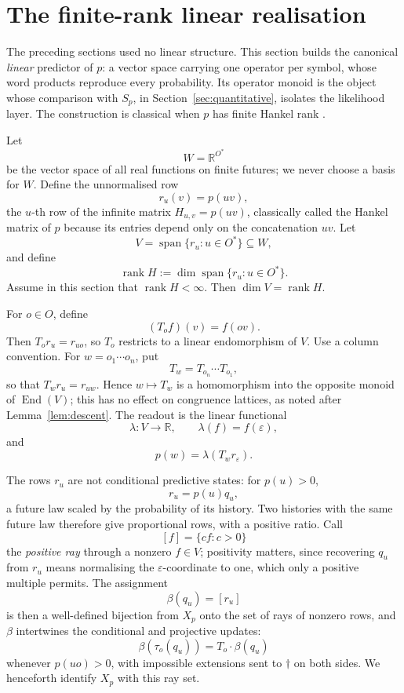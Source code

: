 \documentclass[10pt]{article}
\theoremstyle{definition}
\theoremstyle{remark}
\newcommand{\End}{\operatorname{End}}
\newcommand{\rank}{\operatorname{rank}}
\newcommand{\spn}{\operatorname{span}}
\newcommand{\Obs}{O}
\newcommand{\R}{\mathbb{R}}
\newcommand{\eps}{\varepsilon}
\begin{document}
\section{The finite-rank linear realisation}
\label{sec:linear}

The preceding sections used no linear structure.  This section builds
the canonical \emph{linear} predictor of $p$: a vector space carrying
one operator per symbol, whose word products reproduce every
probability.  Its operator monoid is the object whose comparison with
$S_p$, in Section~\ref{sec:quantitative}, isolates the likelihood
layer.  The construction is classical when $p$ has finite Hankel rank
\cite{Fliess1974,Jaeger2000}.

Let
\[
  W=\R^{\Obs^*}
\]
be the vector space of all real functions on finite futures; we never
choose a basis for $W$.  Define the unnormalised row
\[
  r_u(v)=p(uv),
\]
the $u$-th row of the infinite matrix $H_{u,v}=p(uv)$, classically
called the Hankel matrix of $p$ because its entries depend only on the
concatenation $uv$.  Let
\[
  V=\spn\{r_u:u\in\Obs^*\}\subseteq W,
\]
and define
\[
  \rank H:=\dim\spn\{r_u:u\in\Obs^*\}.
\]
Assume in this section that $\rank H<\infty$.  Then $\dim V=\rank H$.

For $o\in\Obs$, define
\[
  (T_of)(v)=f(ov).
\]
Then $T_or_u=r_{uo}$, so $T_o$ restricts to a linear endomorphism of
$V$.  Use a column convention.  For $w=o_1\cdots o_n$, put
\[
  T_w=T_{o_n}\cdots T_{o_1},
\] so that $T_wr_u=r_{uw}$.  Hence $w\mapsto T_w$ is a homomorphism into the
opposite monoid of $\End(V)$; this has no effect on congruence
lattices, as noted after Lemma~\ref{lem:descent}.  The readout is the
linear functional
\[
  \lambda:V\to\R,\qquad\lambda(f)=f(\eps),
\]
and
\[
  p(w)=\lambda(T_wr_\eps).
\]

The rows $r_u$ are not conditional predictive states: for $p(u)>0$,
\[
  r_u=p(u)q_u,
\]
a future law scaled by the probability of its history.  Two histories
with the same future law therefore give proportional rows, with a
positive ratio.  Call
\[
  [f]=\{cf:c>0\}
\]
the \emph{positive ray} through a nonzero $f\in V$; positivity matters,
since recovering $q_u$ from $r_u$ means normalising the
$\eps$-coordinate to one, which only a positive multiple permits.  The
assignment
\[
  \beta(q_u)=[r_u]
\]
is then a well-defined bijection from $X_p$ onto the set of rays of
nonzero rows, and $\beta$ intertwines the conditional and projective
updates:
\[
  \beta(\tau_o(q_u))=T_o\cdot\beta(q_u)
\]
whenever $p(uo)>0$, with impossible extensions sent to $\dagger$ on
both sides.  We henceforth identify $X_p$ with this ray set.
\end{document}
